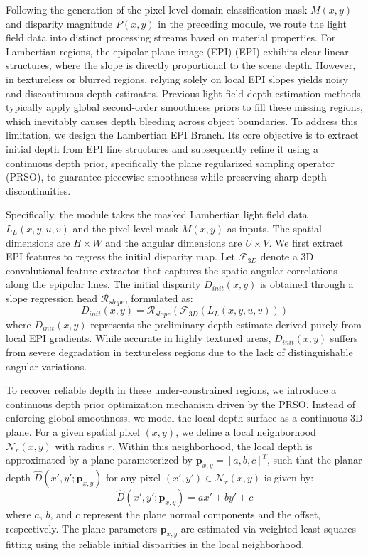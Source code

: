 Following the generation of the pixel-level domain classification mask $M(x,y)$ and disparity magnitude $P(x,y)$ in the preceding module, we route the light field data into distinct processing streams based on material properties. For Lambertian regions, the epipolar plane image (EPI) (EPI) exhibits clear linear structures, where the slope is directly proportional to the scene depth. However, in textureless or blurred regions, relying solely on local EPI slopes yields noisy and discontinuous depth estimates. Previous light field depth estimation methods typically apply global second-order smoothness priors to fill these missing regions, which inevitably causes depth bleeding across object boundaries. To address this limitation, we design the Lambertian EPI Branch. Its core objective is to extract initial depth from EPI line structures and subsequently refine it using a continuous depth prior, specifically the plane regularized sampling operator (PRSO), to guarantee piecewise smoothness while preserving sharp depth discontinuities.

Specifically, the module takes the masked Lambertian light field data $L_L(x,y,u,v)$ and the pixel-level mask $M(x,y)$ as inputs. The spatial dimensions are $H \times W$ and the angular dimensions are $U \times V$. We first extract EPI features to regress the initial disparity map. Let $\mathcal{F}_{3D}$ denote a 3D convolutional feature extractor that captures the spatio-angular correlations along the epipolar lines. The initial disparity $D_{init}(x,y)$ is obtained through a slope regression head $\mathcal{R}_{slope}$, formulated as:
\begin{equation}
\label{eq:eq7}
D_{init}(x,y) = \mathcal{R}_{slope}(\mathcal{F}_{3D}(L_L(x,y,u,v)))
\end{equation}
where $D_{init}(x,y)$ represents the preliminary depth estimate derived purely from local EPI gradients. While accurate in highly textured areas, $D_{init}(x,y)$ suffers from severe degradation in textureless regions due to the lack of distinguishable angular variations.

To recover reliable depth in these under-constrained regions, we introduce a continuous depth prior optimization mechanism driven by the PRSO. Instead of enforcing global smoothness, we model the local depth surface as a continuous 3D plane. For a given spatial pixel $(x,y)$, we define a local neighborhood $\mathcal{N}_r(x,y)$ with radius $r$. Within this neighborhood, the local depth is approximated by a plane parameterized by $\mathbf{p}_{x,y} = [a, b, c]^T$, such that the planar depth $\hat{D}(x',y'; \mathbf{p}_{x,y})$ for any pixel $(x',y') \in \mathcal{N}_r(x,y)$ is given by:
\begin{equation}
\label{eq:eq8}
\hat{D}(x',y'; \mathbf{p}_{x,y}) = a x' + b y' + c
\end{equation}
where $a$, $b$, and $c$ represent the plane normal components and the offset, respectively. The plane parameters $\mathbf{p}_{x,y}$ are estimated via weighted least squares fitting using the reliable initial disparities in the local neighborhood.

